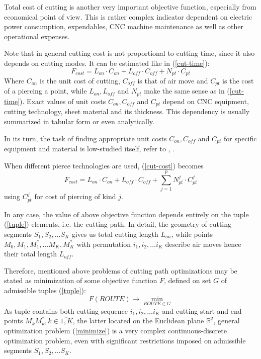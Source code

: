 \documentclass{ifacconf}
\begin{document}
Total cost of cutting is another very important
objective function,
especially from economical point of view.
This is rather complex indicator dependent on
electric power consumption,
expendables,
CNC machine maintenance
as well as other operational expenses.

Note that in general cutting cost is not
proportional to cutting time,
since it also depends on cutting modes.
It can be estimated like in (\ref{cut-time}):
\begin{equation}
    F_{cost} = L_{on}\cdot C_{on} + L_{off}\cdot C_{off} + N_{pt} \cdot C_{pt}
    \label{cut-cost}
\end{equation}
Where
$C_{on}$ is the unit cost of cutting,
$C_{off}$ is that of air move and
$C_{pt}$ is the cost of a piercing a point,
while $L_{on}, L_{off}$ and $N_{pt}$
make the same sense as in (\ref{cut-time}).
Exact values of unit costs
$C_{on}, C_{off}$ and $C_{pt}$
depend on CNC equipment, cutting technology,
sheet material and its thickness.
This dependency is usually summarized
in tabular form or even analytically.

In its turn,
the task of finding appropriate unit costs
$C_{on}, C_{off}$ and $C_{pt}$
for specific equipment and material
is  low-studied itself,
refer to
\cite{Tavaeva2015Nov},
\cite{tavaeva2014issue}.

When different pierce technologies are used,
(\ref{cut-cost}) becomes
\begin{equation}
    F_{cost} = L_{on}\cdot C_{on} + L_{off}\cdot C_{off}
    + \sum_{j=1}^p N_{pt}^j \cdot C_{pt}^j
    \label{piercings-cost}
\end{equation}
using $C_{pt}^j$ for
cost of piercing of kind $j$.

In any case,
the value of above objective function
depends entirely on the tuple
(\ref{tuple})
elements,
i.e. the cutting path.
In detail,
the geometry of cutting segments
$S_1, S_2, \dots S_K$ gives us
total cutting length $L_{on}$,
while points $M_0, M_1, M_1^*, \dots M_K, M_K^*$
with permutation $i_1, i_2, \dots i_K$
describe air moves hence their total length $L_{off}$.

Therefore,
mentioned above problems
of cutting path optimizations may be
stated as minimization of some objective function $F$,
defined on set $G$ of admissible tuples
(\ref{tuple}):
\begin{equation}
    F(ROUTE) \to \min_{ROUTE \in G}
    \label{minimize}
\end{equation}
As tuple contains both
cutting sequence
$i_1, i_2, \dots i_K$
and cutting start and end points
$M_kM_k^*, k \in \overline{1, K}$,
the latter located on the Euclidean plane $\mathbb R^2$,
general optimization problem (\ref{minimize})
is a very complex
continuous-discrete optimization problem,
even with significant restrictions imposed
on admissible segments
$S_1, S_2, \dots S_K$.
\end{document}
